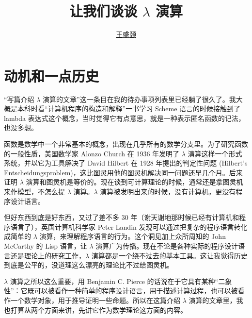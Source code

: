 \documentclass[a4paper,adobefonts]{ctexart}
\begin{document}
\title{{\bfseries 让我们谈谈 $\lambda$ 演算}}
\author{\href{mailto:txyyss@gmail.com}{王盛颐}}
\date{}
\maketitle

\section{动机和一点历史}

``写篇介绍 $\lambda$ 演算的文章''这一条目在我的待办事项列表里已经躺了很久了。我大概是本科时看``计算机程序的构造和解释''一书学习 Scheme 语言的时候接触到了 lambda 表达式这个概念，当时觉得它有点意思，就是一种表示匿名函数的记法，也没多想。

函数是数学中一个非常基本的概念，出现在几乎所有的数学分支里。为了研究函数的一般性质，美国数学家 Alonzo Church 在 1936 年发明了 $\lambda$ 演算这样一个形式系统，并以它为工具解决了 David Hilbert 在 1928 年提出的判定性问题 (Hilbert's Entscheidungsproblem)，这比图灵用他的图灵机解决同一问题还早几个月。后来证明 $\lambda$ 演算和图灵机是等价的。现在谈到可计算理论的时候，通常还是拿图灵机来作模型，不怎么提 $\lambda$ 演算。$\lambda$ 演算被发明出来的时候，没有计算机，更没有程序设计语言。

但好东西到底是好东西，又过了差不多 30 年（谢天谢地那时候已经有计算机和程序语言了），英国计算机科学家 Peter Landin 发现可以通过把复杂的程序语言转化成简单的 $\lambda$ 演算，来理解程序语言的行为。这个洞见加上众所周知的 John McCarthy 的 Lisp 语言，让 $\lambda$ 演算广为传播。现在不论是各种实际的程序设计语言还是理论上的研究工作，$\lambda$ 演算都是一个绕不过去的基本工具。这让我觉得历史到底是公平的，没道理这么漂亮的理论比不过给图灵机。

$\lambda$ 演算之所以这么重要，用 Benjamin C. Pierce 的话说在于它具有某种“二象性”：它既可以被看作一种简单的程序设计语言，用于描述计算过程，也可以被看作一个数学对象，用于推导证明一些命题。所以在这篇介绍 $\lambda$ 演算的文章里，我也打算从两个方面来讲，先讲它作为数学理论这方面的内容。

\end{document}
